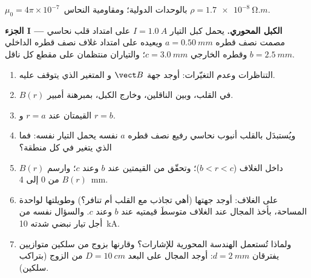 \begin{problem}
\label{pb:b1:magnetostatics:1}
$\mu_0 = 4\pi \times 10^{-7}$~بالوحدات الدولية؛ ومقاومية النحاس $\rho = \qty{1.7e-8}{\ohm.m}$.

\medskip
\noindent\textbf{الجزء I --- الكبل المحوري.}
يحمل كبل التيار $I = \qty{1.0}{A}$ على امتداد قلب نحاسي مصمت نصف قطره
$a = \qty{0.50}{mm}$ ويعيده على امتداد غلاف نصف قطره الداخلي $b =
\qty{2.5}{mm}$ وقطره الخارجي $c = \qty{3.0}{mm}$؛ والتياران منتظمان
على مقطع كل ناقل.
\begin{enumerate}
  \item التناظرات وعدم التغيّرات: أوجد جهة $\vect B$ و
        المتغير الذي يتوقف عليه.
  \item $B(r)$ في القلب، وبين الناقلين، وخارج
        الكبل، بمبرهنة أمبير.
  \item القيمتان عند $r = a$ و $r = b$.
  \item ويُستبدَل بالقلب أنبوب نحاسي رفيع نصف قطره $a$ نفسه
        يحمل التيار نفسه: فما الذي يتغير في كل منطقة؟
  \item $B(r)$ داخل الغلاف ($b < r < c$)؛ وتحقّق من القيمتين عند $b$
        وعند $c$؛ وارسم $B(r)$ من $0$ إلى \qty{4}{mm}.
  \item {} على الغلاف: أوجد جهتها (أهي تجاذب مع القلب أم
        تنافر؟) وطويلتها لواحدة المساحة، بأخذ
        المجال عند الغلاف متوسطَ قيمتيه عند $b$ وعند $c$.
        والسؤال نفسه من أجل تيار نبضي شدته \qty{10}{kA}.
  \item ولماذا تُستعمل الهندسة المحورية للإشارات؟ وقارنها
        بزوج من سلكين متوازيين يفترقان $d = \qty{2}{mm}$: أوجد المجال على البعد
        $D = \qty{10}{cm}$ من الزوج (بتراكب سلكين).
\end{enumerate}


\end{problem}
